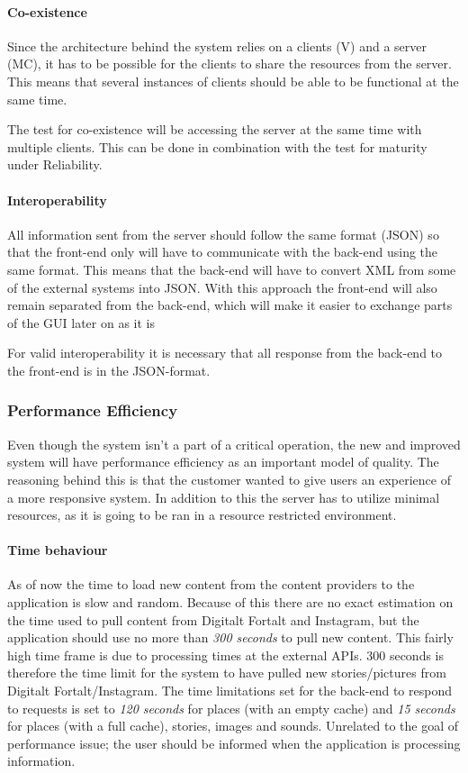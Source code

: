 \paragraph{Co-existence}
Since the architecture behind the system relies on a clients (V) and a server (MC), it has to be possible for the clients to share the resources from the server. This means that several instances of clients should be able to be functional at the same time.

The test for co-existence will be accessing the server at the same time with multiple clients. This can be done in combination with the test for maturity under Reliability.

\paragraph{Interoperability}
All information sent from the server should follow the same format (JSON) so that the front-end only will have to communicate with the back-end using the same format. This means that the back-end will have to convert XML from some of the external systems into JSON. With this approach the front-end will also remain separated from the back-end, which will make it easier to exchange parts of the GUI later on as it is

For valid interoperability it is necessary that all response from the back-end to the front-end is in the JSON-format.

\subsubsection{Performance Efficiency}
Even though the system isn't a part of a critical operation, the new and improved system will have performance efficiency as an important model of quality. The reasoning behind this is that the customer wanted to give users an experience of a more responsive system. In addition to this the server has to utilize minimal resources, as it is going to be ran in a resource restricted environment. 

\paragraph{Time behaviour}
As of now the time to load new content from the content providers to the application is slow and random. Because of this there are no exact estimation on the time used to pull content from Digitalt Fortalt and Instagram, but the application should use no more than \textit{300 seconds} to pull new content. This fairly high time frame is due to processing times at the external APIs. 300 seconds is therefore the time limit for the system to have pulled new stories/pictures from Digitalt Fortalt/Instagram. The time limitations set for the back-end to respond to requests is set to \textit{120 seconds} for places (with an empty cache) and \textit{15 seconds} for places (with a full cache), stories, images and sounds. Unrelated to the goal of performance issue; the user should be informed when the application is processing information.


